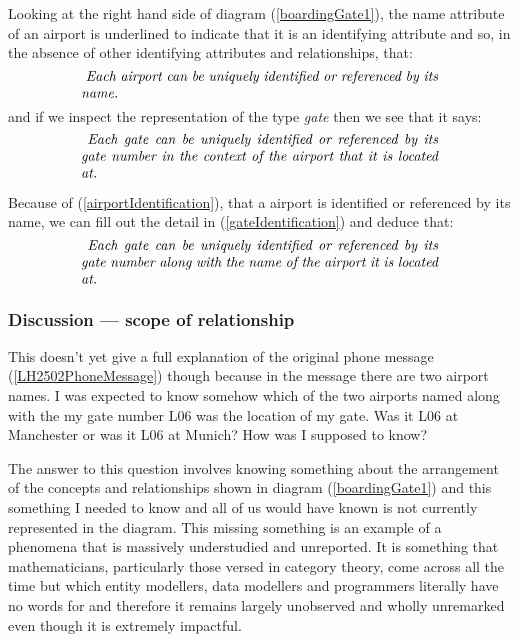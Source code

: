 \mynote
Looking at the right hand side of diagram (\ref{boardingGate1}),
the name attribute of an airport is underlined to indicate that
it is an identifying attribute and so, in the absence of other identifying attributes and relationships,
that:
\begin{equation}
\label{airportIdentification}
\text{\parbox{9cm}{\textit{
Each airport can be uniquely identified or referenced by its name.}}}
\end{equation}
and if we inspect the representation of the type \textit{gate} then we see that it says:
\begin{equation}
\label{gateIdentification}
\text{\parbox{9cm}{\textit{
Each gate can be uniquely identified or referenced by its gate number in the context of the airport that it is located at.}}}
\end{equation}

\mynote
Because of (\ref{airportIdentification}), that a airport is identified or referenced by its name,  we can fill out the detail in (\ref{gateIdentification}) and deduce that:
\begin{equation}
\label{gateNetIdentification}
\text{\parbox{9cm}{\textit{
Each gate can be uniquely identified or referenced by its gate number along with the name of the airport it is located at.}}}
\end{equation}
\subsubsection{Discussion --- scope of relationship}
This doesn't yet give a full explanation of the original phone message 
(\ref{LH2502PhoneMessage}) though because
in the message there are two airport names. 
I was expected to know somehow which of the two airports named along with the my gate number L06
was the location of my gate.  Was it L06 at Manchester or was it L06 at Munich? How was I supposed to know? 

\mynote The answer to this question involves knowing something about the arrangement
of the concepts and relationships shown in diagram (\ref{boardingGate1}) 
and this something I needed to know and all of us would have known is not
currently represented in the diagram.  This missing something is an example of a phenomena  
that is massively understudied and unreported. It is something that mathematicians, particularly those versed in category theory, come across all the time but which entity modellers, data modellers and programmers literally have no words for and therefore it remains largely unobserved and wholly unremarked even though it is extremely impactful.

